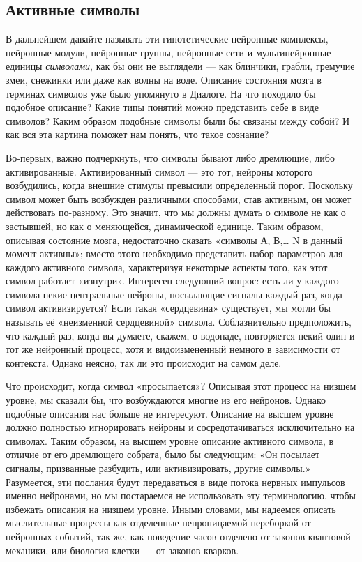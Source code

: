 \documentclass[../main.tex]{subfiles}
\begin{document}
\subsection{Активные символы}

В дальнейшем давайте называть эти гипотетические нейронные комплексы, нейронные модули, нейронные группы, нейронные сети и мультинейронные единицы \emph{символами}, как бы они не выглядели --- как блинчики, грабли, гремучие змеи, снежинки или даже как волны на воде. Описание состояния мозга в терминах символов уже было упомянуто в Диалоге. На что походило бы подобное описание? Какие типы понятий можно представить себе в виде символов? Каким образом подобные символы были бы связаны между собой? И как вся эта картина поможет нам понять, что такое сознание?

Во-первых, важно подчеркнуть, что символы бывают либо дремлющие, либо активированные. Активированный символ --- это тот, нейроны которого возбудились, когда внешние стимулы превысили определенный порог. Поскольку символ может быть возбужден различными способами, став активным, он может действовать по-разному. Это значит, что мы должны думать о символе не как о застывшей, но как о меняющейся, динамической единице. Таким образом, описывая состояние мозга, недостаточно сказать «символы А, В,\ldots{} N в данный момент активны»; вместо этого необходимо представить набор параметров для каждого активного символа, характеризуя некоторые аспекты того, как этот символ работает «изнутри». Интересен следующий вопрос: есть ли у каждого символа некие центральные нейроны, посылающие сигналы каждый раз, когда символ активизируется? Если такая «сердцевина» существует, мы могли бы называть её «неизменной сердцевиной» символа. Соблазнительно предположить, что каждый раз, когда вы думаете, скажем, о водопаде, повторяется некий один и тот же нейронный процесс, хотя и видоизмененный немного в зависимости от контекста. Однако неясно, так ли это происходит на самом деле.

Что происходит, когда символ «просыпается»? Описывая этот процесс на низшем уровне, мы сказали бы, что возбуждаются многие из его нейронов. Однако подобные описания нас больше не интересуют. Описание на высшем уровне должно полностью игнорировать нейроны и сосредотачиваться исключительно на символах. Таким образом, на высшем уровне описание активного символа, в отличие от его дремлющего собрата, было бы следующим: «Он посылает сигналы, призванные разбудить, или активизировать, другие символы.» Разумеется, эти послания будут передаваться в виде потока нервных импульсов именно нейронами, но мы постараемся не использовать эту терминологию, чтобы избежать описания на низшем уровне. Иными словами, мы надеемся описать мыслительные процессы как отделенные непроницаемой переборкой от нейронных событий, так же, как поведение часов отделено от законов квантовой механики, или биология клетки --- от законов кварков.
\end{document}
